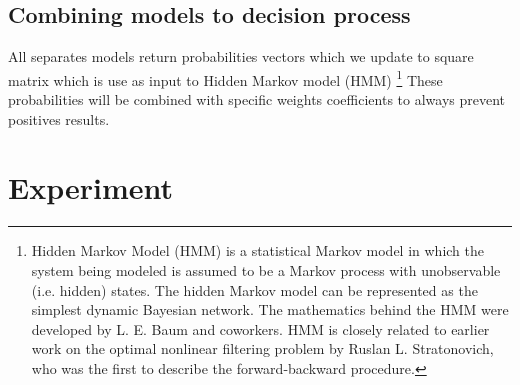 \subsection{Combining models to decision process} \label{subsec:combining_models}
All separates models return probabilities vectors which we update to square matrix which is use as input to Hidden Markov model (HMM) \footnote{Hidden Markov Model (HMM) is a statistical Markov model
in which the system being modeled is assumed to be a Markov process with unobservable (i.e. hidden) states.
The hidden Markov model can be represented as the simplest dynamic Bayesian network.
The mathematics behind the HMM were developed by L. E. Baum and coworkers.
HMM is closely related to earlier work on the optimal nonlinear filtering problem by Ruslan L. Stratonovich,
who was the first to describe the forward-backward procedure.}
These probabilities will be combined with specific weights coefficients to always prevent positives results.
\\
\section{Experiment} \label{experiment}
